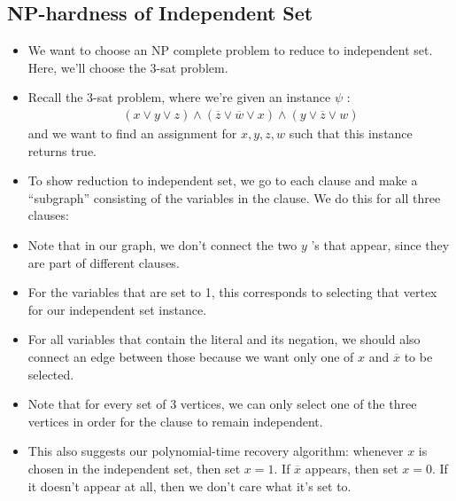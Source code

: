 \subsection{NP-hardness of Independent Set}
\begin{itemize}
	\item We want to choose an NP complete problem to reduce to independent set. Here, we'll choose the 3-sat
		problem.
		
	\item Recall the 3-sat problem, where we're given an instance \( \psi \) :
		\begin{align*}
			(x \lor y \lor z) \land (\overline z \lor \overline w \lor x) \land (y \lor \overline z \lor w)
		\end{align*}
		and we want to find an assignment for \( x,y,z,w \) such that this instance returns true.  
	\item To show reduction to independent set, we go to each clause and make a ``subgraph'' consisting 
		of the variables in the clause. We do this for all three clauses:
		\begin{center}
		\end{center}
	\item Note that in our graph, we don't connect the two \( y \) 's that appear, since they are part of 
		different clauses.
	\item For the variables that are set to 1, this corresponds to selecting that vertex for our independent 
		set instance. 
	\item For all variables that contain the literal and its negation, we should also connect an edge between 
		those because we want only one of \( x \) and \( \overline x \) to be selected. 
	\item Note that for every set of 3 vertices, we can only select one of the three vertices in order for the 
		clause to remain independent.  
	\item This also suggests our polynomial-time recovery algorithm: whenever \( x \) is chosen in the independent
		set, then set \( x  =1\). If \( \overline x \) appears, then set \( x = 0 \). If it doesn't appear at 
		all, then we don't care what it's set to. 
\end{itemize}
